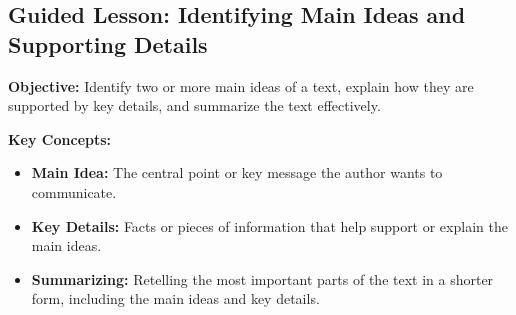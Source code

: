 \documentclass[12pt]{article}
\title{}
\date{}
\begin{document}
\subsection*{Guided Lesson: Identifying Main Ideas and Supporting Details}
\onehalfspacing

\begin{tcolorbox}[colframe=black!40, colback=gray!5, 
coltitle=black, colbacktitle=black!20, fonttitle=\bfseries\Large, 
title=Learning Objective, halign title=center, left=5pt, right=5pt, top=5pt, bottom=15pt]
\textbf{Objective:} Identify two or more main ideas of a text, explain how they are supported by key details, and summarize the text effectively.
\end{tcolorbox}

\vspace{1em}

\begin{tcolorbox}[colframe=black!60, colback=white, 
coltitle=black, colbacktitle=black!15, fonttitle=\bfseries\Large, 
title=Key Concepts and Vocabulary, halign title=center, left=10pt, right=10pt, top=10pt, bottom=15pt]
\textbf{Key Concepts:}
\begin{itemize}
    \item \textbf{Main Idea:} The central point or key message the author wants to communicate.
    \item \textbf{Key Details:} Facts or pieces of information that help support or explain the main ideas.
    \item \textbf{Summarizing:} Retelling the most important parts of the text in a shorter form, including the main ideas and key details.
\end{itemize}
\end{tcolorbox}

\vspace{1em}
\end{document}
